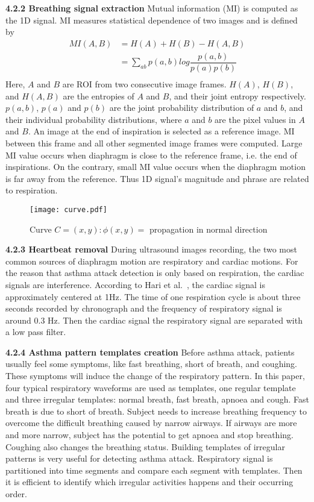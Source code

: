 \textbf{4.2.2 Breathing signal extraction}
Mutual information (MI) is computed as the 1D signal. MI measures statistical dependence of two images and is defined by
\begin{align*}
MI(A,B) &=H(A)+H(B)-H(A, B)\\
            &=\sum\limits_{ab} p(a, b)log\dfrac{p(a, b)}{p(a)p(b)}\\
\end{align*}
Here, $A$ and $B$ are ROI from two consecutive image frames. $H(A)$, $H(B)$, and $H(A, B)$ are the entropies of $A$ and $B$, and their joint entropy respectively. $p(a, b)$, $p(a)$ and $p(b)$ are the joint probability distribution of $a$ and $b$, and their individual probability distributions, where $a$ and $b$ are the pixel values in $A$ and $B$.
An image at the end of inspiration is selected as a reference image. MI between this frame and all other segmented image frames were computed. Large MI value occurs when diaphragm is close to the reference frame, i.e. the end of inspirations. On the contrary, small MI value occurs when the diaphragm motion is far away from the reference. Thus 1D signal's magnitude and phrase are related to respiration.

\begin{figure}[h!]
\centering
\texttt{[image: curve.pdf]}
\caption{Curve \textbf{$C=(x, y): \phi(x, y)=$} propagation in normal direction}
\label{fig.curve}
\end{figure}


\textbf{4.2.3 Heartbeat removal}
During ultrasound images recording, the two most common sources of diaphragm motion are respiratory and cardiac motions. For the reason that asthma attack detection is only based on respiration, the cardiac signals are interference. According to Hari et al.~\cite{Hari:2009}, the cardiac signal is approximately centered at 1Hz. The time of one respiration cycle is about three seconds recorded by chronograph and the frequency of respiratory signal is around 0.3 Hz. Then the cardiac signal the respiratory signal are separated with a low pass filter.

\textbf{4.2.4 Asthma pattern templates creation}
Before asthma attack, patients usually feel some symptoms, like fast breathing, short of breath, and coughing. These symptoms will induce the change of the respiratory pattern. In this paper, four typical respiratory waveforms are used as templates, one regular template and three irregular templates: normal breath, fast breath, apnoea and cough. Fast breath is due to short of breath. Subject needs to increase breathing frequency to overcome the difficult breathing caused by narrow airways. If airways are more and more narrow, subject has the potential to get apnoea and stop breathing. Coughing also changes the breathing status. Building templates of irregular patterns is very useful for detecting asthma attack. Respiratory signal is partitioned into time segments and compare each segment with templates. Then it is efficient to identify which irregular activities happens and their occurring order.

